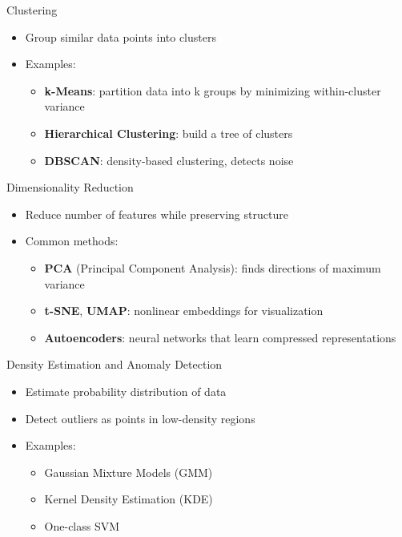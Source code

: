 \documentclass{beamer}
\begin{document}
\begin{frame}{Clustering}
\begin{itemize}
    \item Group similar data points into clusters
    \item Examples:
    \begin{itemize}
        \item \textbf{k-Means}: partition data into k groups by minimizing within-cluster variance
        \item \textbf{Hierarchical Clustering}: build a tree of clusters
        \item \textbf{DBSCAN}: density-based clustering, detects noise
    \end{itemize}
\end{itemize}
\end{frame}

\begin{frame}{Dimensionality Reduction}
\begin{itemize}
    \item Reduce number of features while preserving structure
    \item Common methods:
    \begin{itemize}
        \item \textbf{PCA} (Principal Component Analysis): finds directions of maximum variance
        \item \textbf{t-SNE}, \textbf{UMAP}: nonlinear embeddings for visualization
        \item \textbf{Autoencoders}: neural networks that learn compressed representations
    \end{itemize}
\end{itemize}
\end{frame}

\begin{frame}{Density Estimation and Anomaly Detection}
\begin{itemize}
    \item Estimate probability distribution of data
    \item Detect outliers as points in low-density regions
    \item Examples:
    \begin{itemize}
        \item Gaussian Mixture Models (GMM)
        \item Kernel Density Estimation (KDE)
        \item One-class SVM
    \end{itemize}
\end{itemize}
\end{frame}
\end{document}
